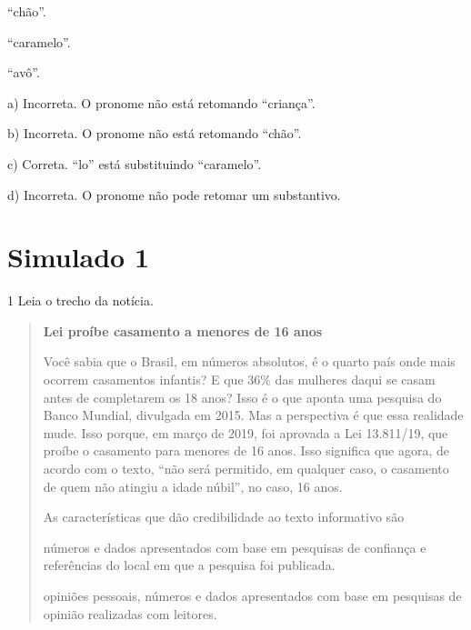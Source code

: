 \begin{escolha}
\begin{escolha}
\begin{escolha}
\item ``chão''.

\item ``caramelo''.

\item ``avô''.
\end{escolha}


a)  Incorreta. O pronome não está retomando ``criança''.

b)  Incorreta. O pronome não está retomando ``chão''.

c)  Correta. ``lo'' está substituindo ``caramelo''.

d)  Incorreta. O pronome não pode retomar um substantivo.

\chapter{Simulado 1}

\num{1} Leia o trecho da notícia.


\begin{quote}
\textbf{Lei proíbe casamento a menores de 16 anos}

Você sabia que o Brasil, em números absolutos, é o quarto país onde mais
ocorrem casamentos infantis? E que 36\% das mulheres daqui se casam
antes de completarem os 18 anos? Isso é o que aponta uma pesquisa do
Banco Mundial, divulgada em 2015. Mas a perspectiva é que essa realidade
mude. Isso porque, em março de 2019, foi aprovada a Lei 13.811/19, que
proíbe o casamento para menores de 16 anos. Isso significa que agora, de
acordo com o texto, ``não será permitido, em qualquer caso, o casamento
de quem não atingiu a idade núbil'', no caso, 16 anos.


As características que dão credibilidade ao texto informativo são

\begin{escolha}
\item números e dados apresentados com base em pesquisas de confiança e
referências do local em que a pesquisa foi publicada.

\item opiniões pessoais, números e dados apresentados com base em
pesquisas de opinião realizadas com leitores.


\end{escolha}
\end{quote}
\end{escolha}
\end{escolha}
